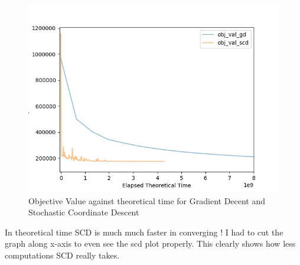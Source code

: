 \documentclass[a4paper,11pt]{article}
\begin{document}
\begin{mlsolution}
\begin{figure}[th]%
\centering

\includegraphics[width=0.6\columnwidth]{q4/theoretical.jpeg}%

\caption{Objective Value against theoretical time for Gradient Decent and Stochastic Coordinate Descent }
\label{fig:proto}%
\end{figure}
In theoretical time SCD is much much faster in converging ! I had to cut the graph along x-axis to even see the scd plot properly. This clearly shows how less computations SCD really takes. 

 
 
 
\end{mlsolution}
					
\end{document}

